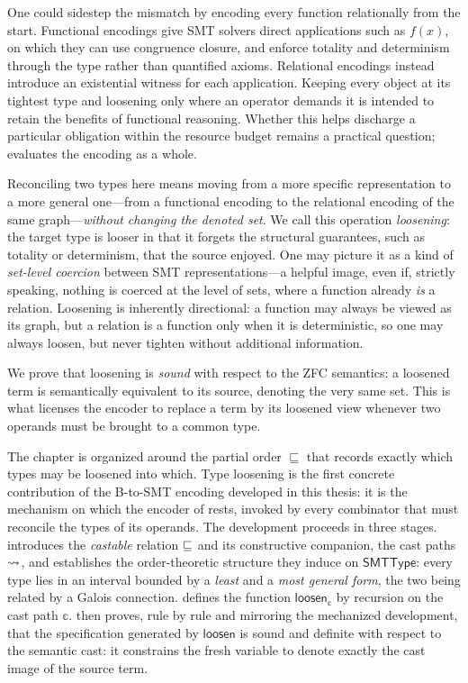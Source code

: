 One could sidestep the mismatch by encoding every function relationally from the start. Functional encodings give SMT solvers direct applications such as $f(x)$, on which they can use congruence closure, and enforce totality and determinism through the type rather than quantified axioms. Relational encodings instead introduce an existential witness for each application. Keeping every object at its tightest type and loosening only where an operator demands it is intended to retain the benefits of functional reasoning. Whether this helps discharge a particular obligation within the resource budget remains a practical question;  evaluates the encoding as a whole.

Reconciling two types here means moving from a more specific representation to a more general one---from a functional encoding to the relational encoding of the same graph---\emph{without changing the denoted set}. We call this operation \emph{loosening}: the target type is looser in that it forgets the structural guarantees, such as totality or determinism, that the source enjoyed. One may picture it as a kind of \emph{set-level coercion} between SMT representations---a helpful image, even if, strictly speaking, nothing is coerced at the level of sets, where a function already \emph{is} a relation. Loosening is inherently directional: a function may always be viewed as its graph, but a relation is a function only when it is deterministic, so one may always loosen, but never tighten without additional information.

We prove that loosening is \emph{sound} with respect to the ZFC semantics: a loosened term is semantically equivalent to its source, denoting the very same set. This is what licenses the encoder to replace a term by its loosened view whenever two operands must be brought to a common type.

The chapter is organized around the partial order $\sqsubseteq$ that records exactly which types may be loosened into which. Type loosening is the first concrete contribution of the B-to-SMT encoding developed in this thesis: it is the mechanism on which the encoder of  rests, invoked by every combinator that must reconcile the types of its operands. The development proceeds in three stages.  introduces the \emph{castable} relation $ \sqsubseteq $ and its constructive companion, the cast paths $ \rightsquigarrow $, and establishes the order-theoretic structure they induce on $\mathsf{SMTType}$: every type lies in an interval bounded by a \emph{least} and a \emph{most general form}, the two being related by a Galois connection.  defines the function $\mathsf{loosen}_{\mathbb{c}}$ by recursion on the cast path $\mathbb{c}$.  then proves, rule by rule and mirroring the mechanized development, that the specification generated by $\mathsf{loosen}$ is sound and definite with respect to the semantic cast: it constrains the fresh variable to denote exactly the cast image of the source term.
